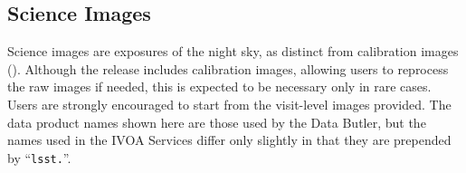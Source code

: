 


%

% 

%



\subsection{Science Images
\label{ssec:science_images}}
Science images are exposures of the night sky, as distinct from \gls{calibration} images ().
Although the release includes \gls{calibration} images, allowing users to reprocess the raw images if needed, this is expected to be necessary only in rare cases.
Users are strongly encouraged to start from the visit-level images provided.
The data product names shown here are those used by the Data \gls{Butler}, but the names used in the IVOA Services differ only slightly in that they are prepended by ``\texttt{lsst.}''.


